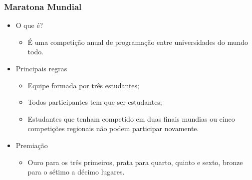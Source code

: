 \begin{frame}
  \frametitle{Maratona Mundial}
  \begin{itemize}
    \item O que é?
    \begin{itemize}
    \item É uma competição anual de programação entre universidades do mundo todo.
    \end{itemize}
    \item Principais regras
    \begin{itemize}
      \item Equipe formada por três estudantes;
      \item Todos participantes tem que ser estudantes;
      \item Estudantes que tenham competido em duas finais mundias ou cinco competições regionais não podem participar novamente.
    \end{itemize}
    \item Premiação
    \begin{itemize}
      \item Ouro para os três primeiros, prata para quarto, quinto e sexto, bronze para o sétimo a décimo lugares.
    \end{itemize}
  \end{itemize}
\end{frame}
